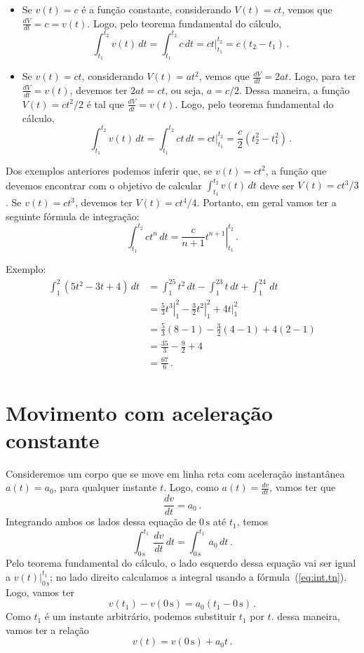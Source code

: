 \documentclass[fontsize=12pt]{scrartcl}
\newcommand{\un}[1]{\mathrm{#1}}
\begin{document}
\begin{itemize}
\item Se $v(t)=c$ é a função constante, considerando $V(t)=ct$, vemos
  que $\frac{dV}{dt}=c=v(t)$. Logo, pelo teorema fundamental do
  cálculo,
  $$\int_{t_1}^{t_2}v(t)\,dt=\int_{t_1}^{t_2}c\,dt=ct|_{t_1}^{t_2}=c(t_2-t_1)\,.$$
\item Se $v(t)=ct$, considerando $V(t)=at^2$, vemos que
  $\frac{dV}{dt}=2at$. Logo, para ter $\frac{dV}{dt}=v(t)$, devemos
  ter $2at=ct$, ou seja, $a=c/2$. Dessa maneira, a função
  $V(t)=ct^2/2$ é tal que $\frac{dV}{dt}=v(t)$. Logo, pelo teorema
  fundamental do cálculo,
  $$\int_{t_1}^{t_2}v(t)\,dt=\int_{t_1}^{t_2}ct\,dt=ct|_{t_1}^{t_2}=\frac{c}{2}(t_2^2-t_1^2)\,.$$
\end{itemize}
Dos exemplos anteriores podemos inferir que, se $v(t)=ct^2$, a função
que devemos encontrar com o objetivo de calcular
$\int_{t_1}^{t_2}v(t)\,dt$ deve ser $V(t)=ct^3/3$. Se $v(t)=ct^3$,
devemos ter $V(t)=ct^4/4$. Portanto, em geral vamos ter a seguinte
fórmula de integração:
\begin{equation}
  \label{eq:int.tn}
  \int_{t_1}^{t_2}ct^n\,dt=\left.\frac{c}{n+1}t^{n+1}\right|_{t_1}^{t_2}\,.
\end{equation}

Exemplo:
\begin{equation*}
  \begin{split}
    \int_1^2(5t^2-3t+4)\,dt&=\int_1^25t^2\,dt-\int_1^23t\,dt+\int_1^24\,dt\\
    &=\left.\frac{5}{3}t^3\right|_1^2-\left.\frac{3}{2}t^2\right|_1^2+4t|_1^2\\
    &=\frac{5}{3}(8-1)-\frac{3}{2}(4-1)+4(2-1)\\
    &=\frac{35}{3}-\frac{9}{2}+4\\
    &=\frac{67}{6}\,.
  \end{split}
\end{equation*}

\section{Movimento com aceleração constante}
Consideremos um corpo que se move em linha reta com aceleração
instantânea $a(t)=a_0$, para qualquer instante $t$. Logo, como
$a(t)=\frac{dv}{dt}$, vamos ter que
$$\frac{dv}{dt}=a_0\,.$$
Integrando ambos os lados dessa equação de $0\,\un s$ até $t_1$, temos
$$\int_{0\,\un s}^{t_1}\frac{dv}{dt}\,dt=\int_{0\,\un s}^{t_1}a_0\,dt\,.$$
Pelo teorema fundamental do cálculo, o lado esquerdo dessa equação vai
ser igual a $v(t)|_{0\,\un s}^{t_1}$; no lado direito calculamos a integral
usando a fórmula~(\ref{eq:int.tn}). Logo, vamos ter
$$v(t_1)-v(0\,\un s)=a_0(t_1-0\,\un s)\,.$$
Como $t_1$ é um instante arbitrário, podemos substituir $t_1$ por $t$. dessa maneira, vamos ter a relação
\begin{equation}
  \label{eq:1}
  v(t)=v(0\,\un s)+a_0t\,.
\end{equation}
\end{document}
